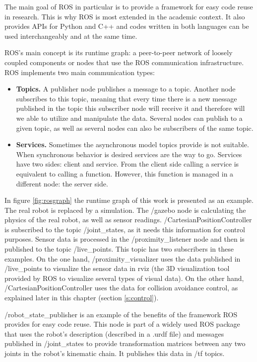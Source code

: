 The main goal of ROS in particular is to provide a framework for easy code reuse in research. This is why ROS is most extended in the academic context. It also provides APIs for Python and C++ and codes written in both languages can be used interchangeably and at the same time.

ROS’s main concept is its runtime graph: a peer-to-peer network of loosely coupled components or nodes that use the ROS communication infrastructure. ROS implements two main communication types:

\begin{itemize}
    \item\textbf{Topics.} A publisher node publishes a message to a topic. Another node subscribes to this topic, meaning that every time there is a new message published in the topic this subscriber node will receive it and therefore will we able to utilize and manipulate the data. Several nodes can publish to a given topic, as well as several nodes can also be subscribers of the same topic.
    \item\textbf{Services.} Sometimes the asynchronous model topics provide is not suitable. When synchronous behavior is desired services are the way to go. Services have two sides: client and service. From the client side calling a service is equivalent to calling a function. However, this function is managed in a different node: the server side.
\end{itemize}

In figure \ref{fig:rosgraph} the runtime graph of this work is presented as an example. The real robot is replaced by a simulation. The /gazebo node is calculating the physics of the real robot, as well as sensor readings.  /CartesianPositionController is subscribed to the topic /joint\_states, as it needs this information for control purposes. Sensor data is processed in the /proximity\_listener node and then is published to the topic /live\_points. This topic has two subscribers in these examples. On the one hand, /proximity\_visualizer uses the data published in /live\_points to visualize the sensor data in rviz (the 3D visualization tool provided by ROS to visualize several types of visual data). On the other hand,  /CartesianPositionController uses the data for collision avoidance control, as explained later in this chapter (section \ref{s:control}).

/robot\_state\_publisher is an example of the benefits of the framework ROS provides for easy code reuse. This node is part of a widely used ROS package that uses the robot’s description (described in a .urdf file) and messages published in /joint\_states to provide transformation matrices between any two joints in the robot’s kinematic chain. It publishes this data in /tf topics.

